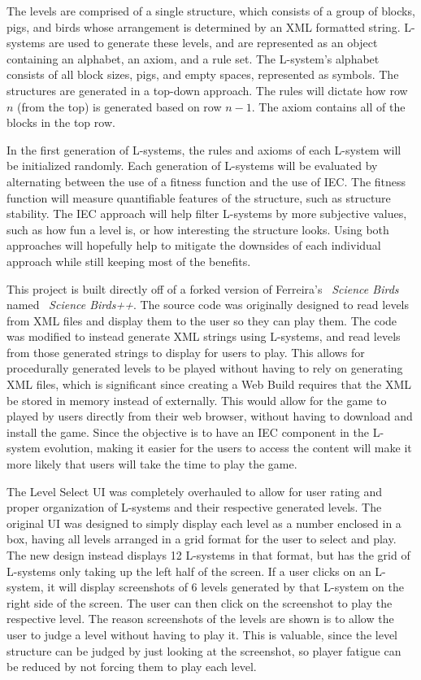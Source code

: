 \documentclass[letterpaper, 10 pt, conference]{ieeeconf}
\begin{document}
The levels are comprised of a single structure, which consists of a group of blocks, pigs, and birds whose arrangement is determined by an XML formatted string. L-systems are used to generate these levels, and are represented as an object containing an alphabet, an axiom, and a rule set. The L-system's alphabet consists of all block sizes, pigs, and empty spaces, represented as symbols. The structures are generated in a top-down approach. The rules will dictate how row $n$ (from the top) is generated based on row $n - 1$. The axiom contains all of the blocks in the top row.
\par
In the first generation of L-systems, the rules and axioms of each L-system will be initialized randomly. Each generation of L-systems will be evaluated by alternating between the use of a fitness function and the use of IEC. The fitness function will measure quantifiable features of the structure, such as structure stability. The IEC approach will help filter L-systems by more subjective values, such as how fun a level is, or how interesting the structure looks. Using both approaches will hopefully help to mitigate the downsides of each individual approach while still keeping most of the benefits.
\par
This project is built directly off of a forked version of Ferreira's ~\textit{Science Birds} named ~\textit{Science Birds++}. The source code was originally designed to read levels from XML files and display them to the user so they can play them. The code was modified to instead generate XML strings using L-systems, and read levels from those generated strings to display for users to play. This allows for procedurally generated levels to be played without having to rely on generating XML files, which is significant since creating a Web Build requires that the XML be stored in memory instead of externally. This would allow for the game to played by users directly from their web browser, without having to download and install the game. Since the objective is to have an IEC component in the L-system evolution, making it easier for the users to access the content will make it more likely that users will take the time to play the game.
\par
The Level Select UI was completely overhauled to allow for user rating and proper organization of L-systems and their respective generated levels. The original UI was designed to simply display each level as a number enclosed in a box, having all levels arranged in a grid format for the user to select and play. The new design instead displays 12 L-systems in that format, but has the grid of L-systems only taking up the left half of the screen. If a user clicks on an L-system, it will display screenshots of 6 levels generated by that L-system on the right side of the screen. The user can then click on the screenshot to play the respective level. The reason screenshots of the levels are shown is to allow the user to judge a level without having to play it. This is valuable, since the level structure can be judged by just looking at the screenshot, so player fatigue can be reduced by not forcing them to play each level.
\end{document}
